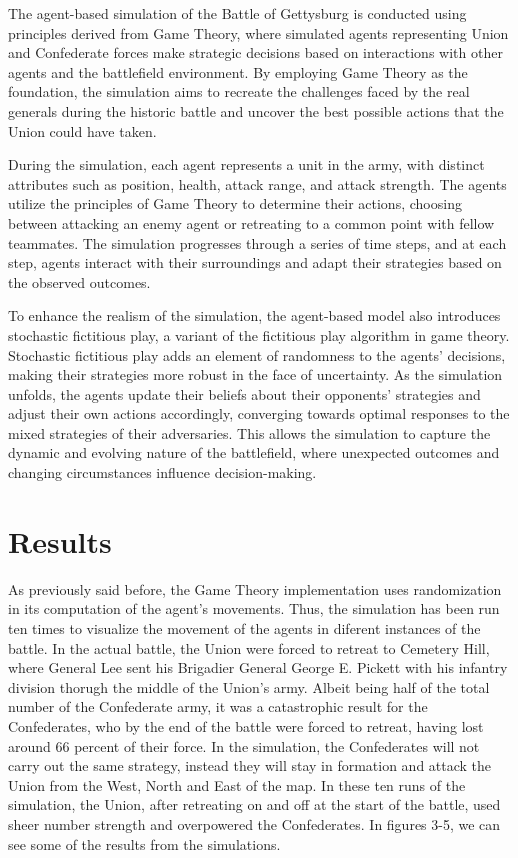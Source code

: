 \documentclass[final,5p,times,twocolumn,authoryear]{elsarticle}
\begin{document}
The agent-based simulation of the Battle of Gettysburg is conducted using principles derived from Game Theory, where simulated agents representing Union and Confederate forces make strategic decisions based on interactions with other agents and the battlefield environment. By employing Game Theory as the foundation, the simulation aims to recreate the challenges faced by the real generals during the historic battle and uncover the best possible actions that the Union could have taken.

During the simulation, each agent represents a unit in the army, with distinct attributes such as position, health, attack range, and attack strength. The agents utilize the principles of Game Theory to determine their actions, choosing between attacking an enemy agent or retreating to a common point with fellow teammates. The simulation progresses through a series of time steps, and at each step, agents interact with their surroundings and adapt their strategies based on the observed outcomes.

To enhance the realism of the simulation, the agent-based model also introduces stochastic fictitious play, a variant of the fictitious play algorithm in game theory. Stochastic fictitious play adds an element of randomness to the agents' decisions, making their strategies more robust in the face of uncertainty. As the simulation unfolds, the agents update their beliefs about their opponents' strategies and adjust their own actions accordingly, converging towards optimal responses to the mixed strategies of their adversaries. This allows the simulation to capture the dynamic and evolving nature of the battlefield, where unexpected outcomes and changing circumstances influence decision-making.

\section{Results}

As previously said before, the Game Theory implementation uses randomization in its computation of the agent's movements. Thus, the simulation has been run ten times to visualize the movement of the agents in diferent instances of the battle. In the actual battle, the Union were forced to retreat to Cemetery Hill, where General Lee sent his Brigadier General George E. Pickett with his infantry division thorugh the middle of the Union's army. Albeit being half of the total number of the Confederate army, it was a catastrophic result for the Confederates, who by the end of the battle were forced to retreat, having lost around 66 percent of their force. In the simulation, the Confederates will not carry out the same strategy, instead they will stay in formation and attack the Union from the West, North and East of the map. In these ten runs of the simulation, the Union, after retreating on and off at the start of the battle, used sheer number strength and overpowered the Confederates. In figures 3-5, we can see some of the results from the simulations.
\end{document}
